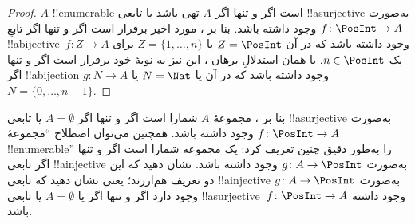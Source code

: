 \documentclass[../../../include/open-logic-section]{subfiles}
\begin{document}
\begin{proof}
$A$ !!{enumerable} است اگر و تنها اگر $A$ تهی باشد یا تابعی
!!a{surjective} به‌صورت $f\colon \PosInt \to A$ وجود داشته باشد. بنا بر
، مورد اخیر برقرار است اگر و تنها اگر تابعِ
!!a{bijective}~$f\colon Z \to A$ وجود داشته باشد که در آن $Z =
\PosInt$ یا $Z = \{1, \dots, n\}$ برای یک $n \in \PosInt$. با همان
استدلالِ برهان ، این نیز به نوبهٔ خود برقرار است
اگر و تنها اگر !!a{bijection} $g\colon N \to A$ وجود داشته باشد که در آن
یا $N = \Nat$ یا $N = \{0, \dots, n-1\}$.
\end{proof}

\begin{prob}
  بنا بر ، مجموعهٔ $A$ شمارا است
  اگر و تنها اگر $A = \emptyset$ یا تابعی !!a{surjective} به‌صورت $f\colon
  \PosInt \to A$ وجود داشته باشد. همچنین می‌توان اصطلاح
  ``مجموعهٔ !!{enumerable}'' را به‌طور دقیق چنین تعریف کرد: یک مجموعه شمارا
  است اگر و تنها اگر تابعی !!a{injective} به‌صورت
  $g\colon A \to \PosInt$ وجود داشته باشد. نشان دهید که این دو تعریف
  هم‌ارزند؛ یعنی نشان دهید که تابعی !!a{injective} به‌صورت
  $g\colon A \to \PosInt$ وجود دارد اگر و تنها اگر یا $A = \emptyset$
  یا تابعی !!a{surjective}~$f\colon \PosInt \to A$ وجود داشته باشد.
\end{prob}
\end{document}
